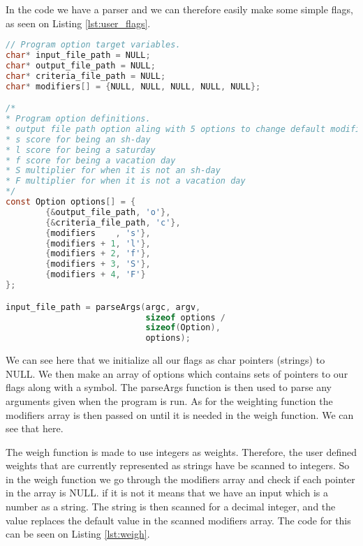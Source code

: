 In the code we have a parser and we can therefore easily make some simple flags, as seen on Listing \ref{lst:user_flags}.

\begin{lstlisting}[caption={Weighting options.}, label={lst:user_flags}, language=c]
// Program option target variables.
char* input_file_path = NULL;
char* output_file_path = NULL;
char* criteria_file_path = NULL;
char* modifiers[] = {NULL, NULL, NULL, NULL, NULL};

/*
* Program option definitions.
* output file path option aling with 5 options to change default modifiers in the weigh function
* s score for being an sh-day
* l score for being a saturday
* f score for being a vacation day 
* S multiplier for when it is not an sh-day 
* F multiplier for when it is not a vacation day
*/
const Option options[] = {
        {&output_file_path, 'o'},
        {&criteria_file_path, 'c'},
        {modifiers    , 's'},
        {modifiers + 1, 'l'},
        {modifiers + 2, 'f'},
        {modifiers + 3, 'S'},
        {modifiers + 4, 'F'}
};

input_file_path = parseArgs(argc, argv, 
                            sizeof options / 
                            sizeof(Option),
                            options);
\end{lstlisting}

We can see here that we initialize all our flags as char pointers (strings) to NULL. We then make an array of options which contains sets of pointers to our flags along with a symbol. The parseArgs function is then used to parse any arguments given when the program is run.  As for the weighting function the modifiers array is then passed on until it is needed in the weigh function. We can see that here.

The weigh function is made to use integers as weights. Therefore, the user defined weights that are currently represented as strings have be scanned to integers. So in the weigh function we go through the modifiers array and check if each pointer in the array is NULL. if it is not it means that we have an input which is a number as a string. The string is then scanned for a decimal integer, and the value replaces the default value in the scanned modifiers array. The code for this can be seen on Listing \ref{lst:weigh}.


